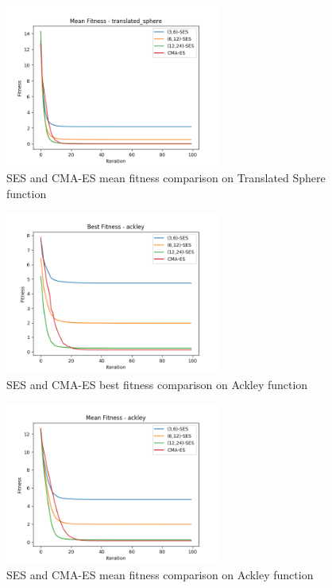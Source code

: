\begin{figure}
  \begin{center}
  \includegraphics[width=2.8in]{./../code/benchmark_results/mean_fitness-translated_sphere.png}
  \caption{SES and CMA-ES mean fitness comparison on Translated Sphere function}
  \label{img:mean_fitness-translated_sphere}
  \end{center}
\end{figure}

\begin{figure}
  \begin{center}
  \includegraphics[width=2.8in]{./../code/benchmark_results/best_fitness-ackley.png}
  \caption{SES and CMA-ES best fitness comparison on Ackley function}
  \label{img:best_fitness-ackley}
  \end{center}
\end{figure}

\begin{figure}
  \begin{center}
  \includegraphics[width=2.8in]{./../code/benchmark_results/mean_fitness-ackley.png}
  \caption{SES and CMA-ES mean fitness comparison on Ackley function}
  \label{img:mean_fitness-ackley}
  \end{center}
\end{figure}

